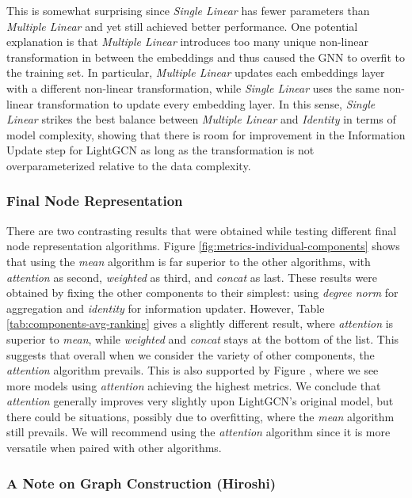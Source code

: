 \documentclass{article}
\begin{document}
This is somewhat surprising since \textit{Single Linear} has fewer parameters than \textit{Multiple Linear} and yet still achieved better performance. One potential explanation is that \textit{Multiple Linear} introduces too many unique non-linear transformation in between the embeddings and thus caused the GNN to overfit to the training set. In particular, \textit{Multiple Linear} updates each embeddings layer with a different non-linear transformation, while \textit{Single Linear} uses the same non-linear transformation to update every embedding layer. In this sense, \textit{Single Linear} strikes the best balance between \textit{Multiple Linear} and \textit{Identity} in terms of model complexity, showing that there is room for improvement in the Information Update step for LightGCN as long as the transformation is not overparameterized relative to the data complexity.


\subsubsection{Final Node Representation} \label{final-node-repr-discussion}

There are two contrasting results that were obtained while testing different final node representation algorithms. Figure \ref{fig:metrics-individual-components} shows that using the \textit{mean} algorithm is far superior to the other algorithms, with \textit{attention} as second, \textit{weighted} as third, and \textit{concat} as last. These results were obtained by fixing the other components to their simplest: using \textit{degree norm} for aggregation and \textit{identity} for information updater. However, Table \ref{tab:components-avg-ranking} gives a slightly different result, where \textit{attention} is superior to \textit{mean}, while \textit{weighted} and \textit{concat} stays at the bottom of the list. This suggests that overall when we consider the variety of other components, the \textit{attention} algorithm prevails. This is also supported by Figure \label{fig:metrics-overall}, where we see more models using \textit{attention} achieving the highest metrics. We conclude that \textit{attention} generally improves very slightly upon LightGCN's original model, but there could be situations, possibly due to overfitting, where the \textit{mean} algorithm still prevails. We will recommend using the \textit{attention} algorithm since it is more versatile when paired with other algorithms.


\subsubsection{A Note on Graph Construction (Hiroshi)}
\end{document}
